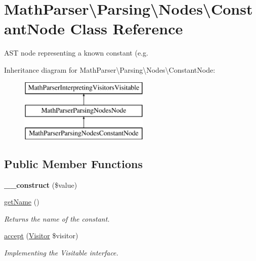 \hypertarget{classMathParser_1_1Parsing_1_1Nodes_1_1ConstantNode}{\section{Math\-Parser\textbackslash{}Parsing\textbackslash{}Nodes\textbackslash{}Constant\-Node Class Reference}
\label{classMathParser_1_1Parsing_1_1Nodes_1_1ConstantNode}
}


A\-S\-T node representing a known constant (e.\-g.  


Inheritance diagram for Math\-Parser\textbackslash{}Parsing\textbackslash{}Nodes\textbackslash{}Constant\-Node\-:\begin{figure}[H]
\begin{center}
\leavevmode
\includegraphics[height=3.000000cm]{classMathParser_1_1Parsing_1_1Nodes_1_1ConstantNode}
\end{center}
\end{figure}
\subsection*{Public Member Functions}
\begin{DoxyCompactItemize}
\item 
\hypertarget{classMathParser_1_1Parsing_1_1Nodes_1_1ConstantNode_a2ad61188ed04bb2fd99dda2db380afbd}{{\bfseries \-\_\-\-\_\-construct} (\$value)}\label{classMathParser_1_1Parsing_1_1Nodes_1_1ConstantNode_a2ad61188ed04bb2fd99dda2db380afbd}

\item 
\hyperlink{classMathParser_1_1Parsing_1_1Nodes_1_1ConstantNode_a537089b5aa92491a904193f449318090}{get\-Name} ()
\begin{DoxyCompactList}\small\item\em Returns the name of the constant. \end{DoxyCompactList}\item 
\hypertarget{classMathParser_1_1Parsing_1_1Nodes_1_1ConstantNode_a5debc023d33ccf262a4c73569b4af841}{\hyperlink{classMathParser_1_1Parsing_1_1Nodes_1_1ConstantNode_a5debc023d33ccf262a4c73569b4af841}{accept} (\hyperlink{interfaceMathParser_1_1Interpreting_1_1Visitors_1_1Visitor}{Visitor} \$visitor)}\label{classMathParser_1_1Parsing_1_1Nodes_1_1ConstantNode_a5debc023d33ccf262a4c73569b4af841}

\begin{DoxyCompactList}\small\item\em Implementing the Visitable interface. \end{DoxyCompactList}\end{DoxyCompactItemize}
